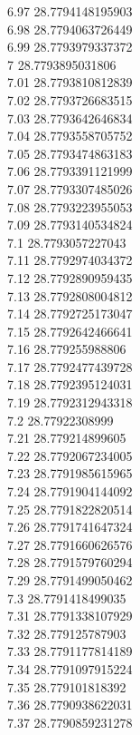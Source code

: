 {6.97	28.7794148195903\\
6.98	28.7794063726449\\
6.99	28.7793979337372\\
7	28.7793895031806\\
7.01	28.7793810812839\\
7.02	28.7793726683515\\
7.03	28.7793642646834\\
7.04	28.7793558705752\\
7.05	28.7793474863183\\
7.06	28.7793391121999\\
7.07	28.7793307485026\\
7.08	28.7793223955053\\
7.09	28.7793140534824\\
7.1	28.7793057227043\\
7.11	28.7792974034372\\
7.12	28.7792890959435\\
7.13	28.7792808004812\\
7.14	28.7792725173047\\
7.15	28.7792642466641\\
7.16	28.779255988806\\
7.17	28.7792477439728\\
7.18	28.7792395124031\\
7.19	28.7792312943318\\
7.2	28.77922308999\\
7.21	28.779214899605\\
7.22	28.7792067234005\\
7.23	28.7791985615965\\
7.24	28.7791904144092\\
7.25	28.7791822820514\\
7.26	28.7791741647324\\
7.27	28.7791660626576\\
7.28	28.7791579760294\\
7.29	28.7791499050462\\
7.3	28.7791418499035\\
7.31	28.7791338107929\\
7.32	28.779125787903\\
7.33	28.7791177814189\\
7.34	28.7791097915224\\
7.35	28.779101818392\\
7.36	28.7790938622031\\
7.37	28.7790859231278\\
}

